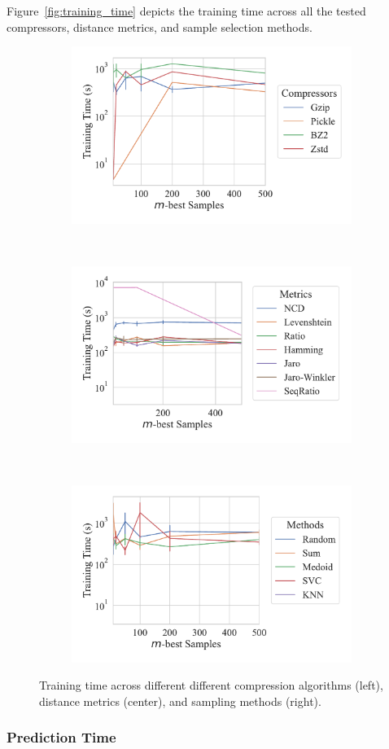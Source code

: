 \documentclass[sigconf]{acmart}
\begin{document}
Figure~\ref{fig:training_time} depicts the training time across all the tested compressors, distance metrics, and sample selection methods.

\begin{figure}
	\begin{subfigure}
		\centering
		\includegraphics[width=.32\textwidth]{figs/kdd_nsl/compressor_vs_train_time.pdf}
	\end{subfigure}%
	~
	\begin{subfigure}
		\centering
		\includegraphics[width=.32\textwidth]{figs/kdd_nsl/metric_vs_train_time.pdf}
	\end{subfigure}
	~
	\begin{subfigure}
		\centering
		\includegraphics[width=.32\textwidth]{figs/kdd_nsl/method_vs_train_time.pdf}
	\end{subfigure}
	\caption{Training time across different different compression algorithms (left), distance metrics (center), and sampling methods (right).}
	\label{fig:training_time_kdd}
\end{figure}

\subsubsection{Prediction Time}
\end{document}
